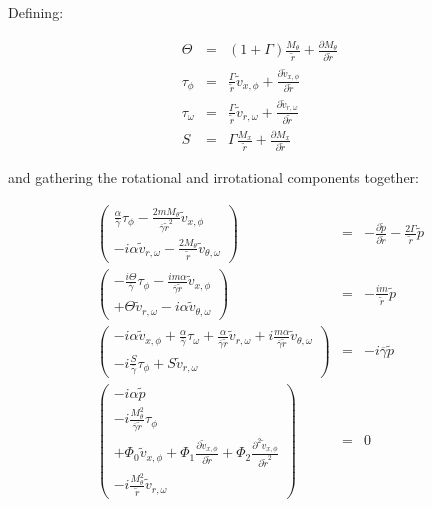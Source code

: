 \documentclass[12pt]{article}
\begin{document}
Defining:

\begin{eqnarray}
\Theta &=&
\left(1 + \Gamma \right)
\frac{M_{\theta} }{\widetilde{r}}
+
\frac{\partial M_{\theta} }{\partial \widetilde{r}}
\nonumber
\\
\tau_{\phi}
&=&
\frac{\Gamma}{\widetilde{r}}
\widetilde{v}_{x,\phi}
+
\frac{\partial \widetilde{v}_{x,\phi}}{\partial \widetilde{r}} 
\nonumber
\\
\tau_{\omega}
&=&
\frac{\Gamma}{\widetilde{r}}
\widetilde{v}_{r,\omega}
+
\frac{\partial \widetilde{v}_{r,\omega}}{\partial \widetilde{r}} 
\nonumber
\\
S
&=&
\Gamma \frac{M_x }{\widetilde{r}}
+
\frac{\partial M_x }{\partial \widetilde{r}} 
\nonumber
\end{eqnarray}

and gathering the rotational and irrotational components together:

\begin{eqnarray}
\left(
\begin{array}{r}
\frac{\alpha}{ \overline{\gamma}} \tau_{\phi}
-\frac{2 m M_{\theta}}{\overline{\gamma} \widetilde{r}^2} 
\widetilde{v}_{x,\phi}
\\
-i \alpha \widetilde{v}_{r,\omega} 
-\frac{2 M_{\theta}}{\widetilde{r}} 
\widetilde{v}_{\theta,\omega} 
\end{array}
\right)
&=&
-
\frac{\partial \widetilde{p} }{\partial \widetilde{r}} 
-
\frac{2 \Gamma}{\widetilde{r}} \widetilde{p}
\nonumber
\\
\left(
\begin{array}{r}
-\frac{i \Theta}{ \overline{\gamma}}
\tau_{\phi}
-
\frac{i m \alpha}{\overline{\gamma} \widetilde{r}} 
\widetilde{v}_{x,\phi}
\\
+
\Theta
\widetilde{v}_{r,\omega} 
-i
\alpha
\widetilde{v}_{\theta,\omega} 
\end{array}
\right)
&=&
-\frac{i m }{\widetilde{r} } \widetilde{p}
\nonumber
\\
\left(
\begin{array}{r}
-i \alpha
\widetilde{v}_{x,\phi} 
+ 
\frac{\alpha}{\overline{\gamma}}
\tau_{\omega}
+
\frac{ \alpha }{\overline{\gamma}
\widetilde{r}}
 \widetilde{v}_{r,\omega}
+i 
 \frac{m \alpha}{\overline{\gamma} \widetilde{r}} \widetilde{v}_{\theta,\omega}
\\
-i
\frac{S}{ \overline{\gamma}}
\tau_{\phi}
+ S \widetilde{v}_{r,\omega} 
\end{array}
\right)
&=&
-i \overline{\gamma} \widetilde{p}
\nonumber
\\
\left(
\begin{array}{r}
-i
\alpha
 \widetilde{p}
\\
-i
\frac{M_{\theta}^2}{\overline{\gamma} \widetilde{r}}
\tau_{\phi}
\\
+ 
\Phi_0 
\widetilde{v}_{x,\phi}
+\Phi_1 
\frac{\partial
\widetilde{v}_{x,\phi}
}{\partial \widetilde{r}} 
+\Phi_2 
\frac{\partial^2
\widetilde{v}_{x,\phi}
}{\partial \widetilde{r}^2} 
\\
- i
\frac{M_{\theta}^2}
{
\widetilde{r}
}
\widetilde{v}_{r,\omega} 
\end{array}
\right)
&=&
0
\nonumber
\end{eqnarray}
\end{document}

